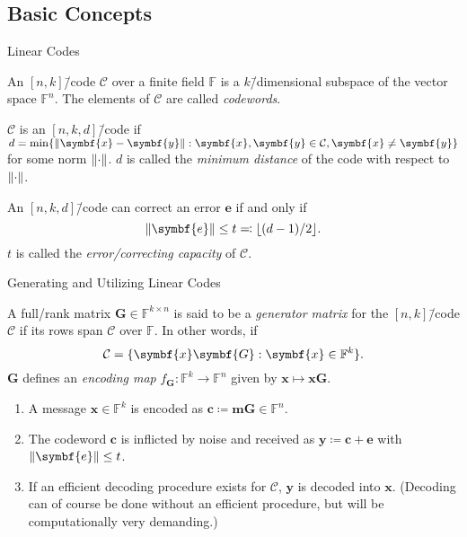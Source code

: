 \documentclass[usepdftitle=false]{beamer}
\renewcommand*{\vec}{\symbf}
\newcommand*{\mat}{\symbf}
\newcommand*{\FF}{\ensuremath{\mathbb{F}}}
\DeclarePairedDelimiter{\floor}{\lfloor}{\rfloor}
\DeclarePairedDelimiter{\norm}{\lVert}{\rVert}
\begin{document}
\subsection{Basic Concepts}

\begin{frame}{Linear Codes}
  \begin{definition}
    An \([n, k]\)\=/code \(\mathcal{C}\) over a finite field \(\FF\)
    is a \(k\)\=/dimensional subspace of the vector space \(\FF^n\).
    The elements of \(\mathcal{C}\) are called \emph{codewords}.

    \(\mathcal{C}\) is an \([n, k, d]\)\=/code if
    \(d = \min\{\norm{\vec{x} - \vec{y}} : \vec{x}, \vec{y} \in
    \mathcal{C}, \vec{x} \ne \vec{y}\}\) for some norm
    \(\norm{\cdot}\).  \(d\) is called the \emph{minimum distance} of
    the code with respect to \(\norm{\cdot}\).
  \end{definition}
  An \([n, k, d]\)\=/code can correct an error \(\vec{e}\) if and only
  if \[\norm{\vec{e}} \le t \eqqcolon \floor{(d - 1) / {2}}\text.\]
  \(t\) is called the \emph{error\-/correcting capacity} of
  \(\mathcal{C}\).
\end{frame}

\begin{frame}{Generating and Utilizing Linear Codes}
  \begin{definition}
    A full\-/rank matrix \(\mat{G} \in \FF^{k \times n}\) is said to
    be a \emph{generator matrix} for the \([n, k]\)\=/code
    \(\mathcal{C}\) if its rows span \(\mathcal{C}\) over \(\FF\).  In
    other words, if
    \[
      \mathcal{C} = \{\vec{x} \mat{G} : \vec{x} \in \FF^k\}\text.
    \]
    \(\mat{G}\) defines an \emph{encoding map}
    \(f_{\mat{G}}\colon \FF^k \to \FF^n\) given by
    \(\vec{x} \mapsto \vec{x} \vec{G}\).
  \end{definition}
  \begin{enumerate}
  \item A message \(\vec{x} \in \FF^k\) is encoded as
    \(\vec{c} \coloneqq \vec{m}\mat{G} \in \FF^n\).
  \item The codeword \(\vec{c}\) is inflicted by noise and received as
    \(\vec{y} \coloneqq \vec{c} + \vec{e}\) with
    \(\norm{\vec{e}} \le t\).
  \item If an efficient decoding procedure exists for \(\mathcal{C}\),
    \(\vec{y}\) is decoded into \(\vec{x}\).  (Decoding can of course
    be done without an efficient procedure, but will be
    computationally very demanding.)
  \end{enumerate}
\end{frame}
\end{document}
